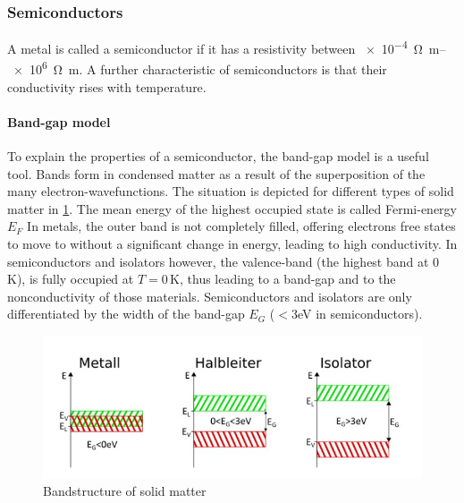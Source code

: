 \documentclass[english,  %
parskip=full,  %
headsepline]{scrartcl}
\begin{document}
\subsubsection{Semiconductors}
A metal is called a semiconductor if it has a resistivity between \SIrange{e-4}{e6}{\ohm m}. A further characteristic of semiconductors is that their conductivity rises with temperature.
\paragraph{Band-gap model}
To explain the properties of a semiconductor, the band-gap model is a useful tool. Bands form in condensed matter as a result of the superposition of the many electron-wavefunctions. The situation is depicted for different types of solid matter in \cref{fig:bandstructures}. The mean energy of the highest occupied state is called Fermi-energy $E_F$ In metals, the outer band is not completely filled, offering electrons free states to move to without a significant change in energy, leading to high conductivity. In semiconductors and isolators however, the valence-band (the highest band at 0\,K), is fully occupied at $T=0$\,K, thus leading to a band-gap and to the nonconductivity of those materials. Semiconductors and isolators are only differentiated by the width of the band-gap $E_G$ ($<3$eV in semiconductors).
\begin{figure}[H]
    \centering
    \includegraphics[width=0.7\linewidth]{bandstructures.jpg}
    \caption{Bandstructure of solid matter \cite{instructions}}
    \label{fig:bandstructures}
\end{figure}
\end{document}
